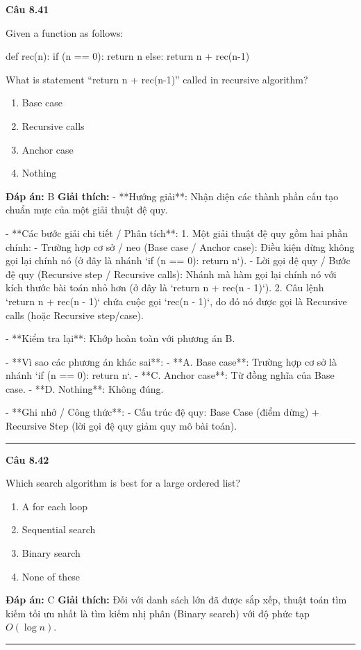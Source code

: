 \documentclass[11pt,a4paper]{article}
\newenvironment{question}[1]{%
  \par\vspace{1em}\noindent\textbf{\large Câu #1}\par\vspace{0.4em}
}{%
  \par\vspace{1em}\hrule\vspace{0.6em}
}
\newenvironment{choices}{%
  \begin{enumerate}[label=\textbf{\Alph*.},leftmargin=2.2em,itemsep=2pt,topsep=3pt]
}{%
  \end{enumerate}
}
\newcommand{\choice}{\item}
\newenvironment{codebox}{%
  \begin{tcolorbox}[colback=gray!8!white,colframe=gray!50!black,arc=1.5mm,boxrule=0.6pt,left=3mm,right=3mm,top=2.5mm,bottom=2.5mm]
  \ttfamily\small
}{%
  \end{tcolorbox}
}
\begin{document}
\begin{question}{8.41}
Given a function as follows:
\begin{codebox}
def rec(n):
    if (n == 0):
        return n
    else:
        return n + rec(n-1)
\end{codebox}
What is statement ``return n + rec(n-1)'' called in recursive algorithm?
\begin{choices}
\choice Base case
\choice Recursive calls
\choice Anchor case
\choice Nothing
\end{choices}
\textbf{Đáp án:} B
\textbf{Giải thích:} - **Hướng giải**:
  Nhận diện các thành phần cấu tạo chuẩn mực của một giải thuật đệ quy.

- **Các bước giải chi tiết / Phân tích**:
  1. Một giải thuật đệ quy gồm hai phần chính:
     - Trường hợp cơ sở / neo (Base case / Anchor case): Điều kiện dừng không gọi lại chính nó (ở đây là nhánh `if (n == 0): return n`).
     - Lời gọi đệ quy / Bước đệ quy (Recursive step / Recursive calls): Nhánh mà hàm gọi lại chính nó với kích thước bài toán nhỏ hơn (ở đây là `return n + rec(n - 1)`).
  2. Câu lệnh `return n + rec(n - 1)` chứa cuộc gọi `rec(n - 1)`, do đó nó được gọi là Recursive calls (hoặc Recursive step/case).

- **Kiểm tra lại**:
  Khớp hoàn toàn với phương án B.

- **Vì sao các phương án khác sai**:
  - **A. Base case**: Trường hợp cơ sở là nhánh `if (n == 0): return n`.
  - **C. Anchor case**: Từ đồng nghĩa của Base case.
  - **D. Nothing**: Không đúng.

- **Ghi nhớ / Công thức**:
  - Cấu trúc đệ quy: Base Case (điểm dừng) + Recursive Step (lời gọi đệ quy giảm quy mô bài toán).
\end{question}

\begin{question}{8.42}
Which search algorithm is best for a large ordered list?
\begin{choices}
\choice A for each loop
\choice Sequential search
\choice Binary search
\choice None of these
\end{choices}
\textbf{Đáp án:} C
\textbf{Giải thích:} Đối với danh sách lớn đã được sắp xếp, thuật toán tìm kiếm tối ưu nhất là tìm kiếm nhị phân (Binary search) với độ phức tạp \(O(\log n)\).
\end{question}
\end{document}

